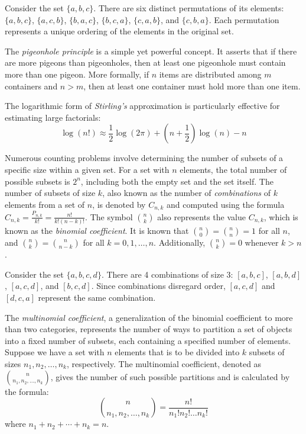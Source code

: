 \begin{example}
Consider the set $\{a, b, c\}$. There are six distinct permutations of its elements: $\{a, b, c\}$, $\{a, c, b\}$, $\{b, a, c\}$, $\{b, c, a\}$, $\{c, a, b\}$, and $\{c, b, a\}$. Each permutation represents a unique ordering of the elements in the original set. 
\end{example}

The \emph{pigeonhole principle} is a simple yet powerful concept. It asserts that if there are more pigeons than pigeonholes, then at least one pigeonhole must contain more than one pigeon. More formally, if $n$ items are distributed among $m$ containers and $n > m$, then at least one container must hold more than one item.

The logarithmic form of \emph{Stirling's} approximation is particularly effective for estimating large factorials:
\[
\log\left(n!\right) \approx \frac{1}{2}\log\left(2\pi\right)+\left(n+\frac{1}{2}\right)\log\left(n\right)-n
\]

Numerous counting problems involve determining the number of subsets of a specific size within a given set. For a set with $n$ elements, the total number of possible subsets is $2^n$, including both the empty set and the set itself. The number of subsets of size $k$, also known as the number of \emph{combinations} of $k$ elements from a set of $n$, is denoted by $C_{n,k}$ and computed using the formula $C_{n,k} = \frac{P_{n,k}}{k!} = \frac{n!}{k!(n-k)!}
$. The symbol ${n \choose k}$ also represents the value $C_{n,k}$, which is known as the \emph{binomial coefficient}. It is known that ${n \choose 0} = {n \choose n} = 1$ for all $n$, and ${n \choose k} = {n \choose n-k}$ for all $k = 0, 1, \ldots, n$. Additionally, ${n \choose k} = 0$ whenever $k > n$.

\begin{example}
Consider the set $\{a, b, c, d\}$. There are 4 combinations of size 3: $[a, b, c]$, $[a, b, d]$, $[a, c, d]$, and $[b, c, d]$. Since combinations disregard order, $[a, c, d]$ and $[d, c, a]$ represent the same combination.
\end{example}

The \emph{multinomial coefficient}, a generalization of the binomial coefficient to more than two categories, represents the number of ways to partition a set of objects into a fixed number of subsets, each containing a specified number of elements. Suppose we have a set with $n$ elements that is to be divided into $k$ subsets of sizes $n_1, n_2, \ldots, n_k$, respectively. The multinomial coefficient, denoted as ${n \choose n_{1}, n_{2},\ldots, n_{k}}$, gives the number of such possible partitions and is calculated by the formula:
\[
{n \choose n_{1},n_{2},\ldots,n_{k}} = \frac{n!}{n_{1}!n_{2}!\ldots n_{k}!}
\]
where $n_1 + n_2 + \cdots + n_k = n$.

